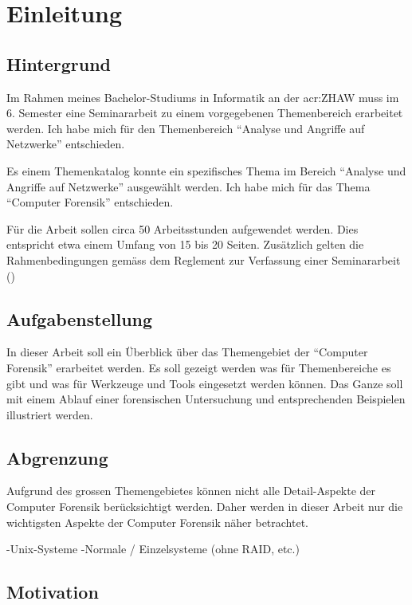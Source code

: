 
\chapter{Einleitung}


\section{Hintergrund}
Im Rahmen meines Bachelor-Studiums in Informatik an der \gls{acr:ZHAW} muss im 6. Semester eine Seminararbeit zu einem vorgegebenen Themenbereich erarbeitet werden. Ich habe mich für den Themenbereich "`Analyse und Angriffe auf Netzwerke"' entschieden.

Es einem Themenkatalog konnte ein spezifisches Thema im Bereich "`Analyse und Angriffe auf Netzwerke"' ausgewählt werden. Ich habe mich für das Thema "`Computer Forensik"' entschieden.

Für die Arbeit sollen circa 50 Arbeitsstunden aufgewendet werden. Dies entspricht etwa einem Umfang von 15 bis 20 Seiten. Zusätzlich gelten die Rahmenbedingungen gemäss dem Reglement zur Verfassung einer Seminararbeit (\cite{ZHAW:2012:Seminararbeit:Reglemente})

\section{Aufgabenstellung}
In dieser Arbeit soll ein Überblick über das Themengebiet der "`Computer Forensik"' erarbeitet werden. Es soll gezeigt werden was für Themenbereiche es gibt und was für Werkzeuge und Tools eingesetzt werden können. Das Ganze soll mit einem Ablauf einer forensischen Untersuchung und entsprechenden Beispielen illustriert werden.

\section{Abgrenzung}
Aufgrund des grossen Themengebietes können nicht alle Detail-Aspekte der Computer Forensik berücksichtigt werden. Daher werden in dieser Arbeit nur die wichtigsten Aspekte der Computer Forensik näher betrachtet.

-Unix-Systeme
-Normale / Einzelsysteme (ohne RAID, etc.)

\section{Motivation}

